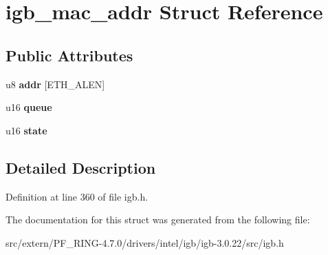 \hypertarget{structigb__mac__addr}{
\section{igb\_\-mac\_\-addr Struct Reference}
\label{structigb__mac__addr}
}
\subsection*{Public Attributes}
\begin{DoxyCompactItemize}
\item 
\hypertarget{structigb__mac__addr_a6cb8b20b4e2b704b626c6ea1e29e983b}{
u8 {\bfseries addr} \mbox{[}ETH\_\-ALEN\mbox{]}}
\label{structigb__mac__addr_a6cb8b20b4e2b704b626c6ea1e29e983b}

\item 
\hypertarget{structigb__mac__addr_ac737a28ea73d15bc2f84e94615b20e51}{
u16 {\bfseries queue}}
\label{structigb__mac__addr_ac737a28ea73d15bc2f84e94615b20e51}

\item 
\hypertarget{structigb__mac__addr_af904a9b7e4637e6ad4be58f8f5c5759e}{
u16 {\bfseries state}}
\label{structigb__mac__addr_af904a9b7e4637e6ad4be58f8f5c5759e}

\end{DoxyCompactItemize}


\subsection{Detailed Description}


Definition at line 360 of file igb.h.



The documentation for this struct was generated from the following file:\begin{DoxyCompactItemize}
\item 
src/extern/PF\_\-RING-\/4.7.0/drivers/intel/igb/igb-\/3.0.22/src/igb.h\end{DoxyCompactItemize}
